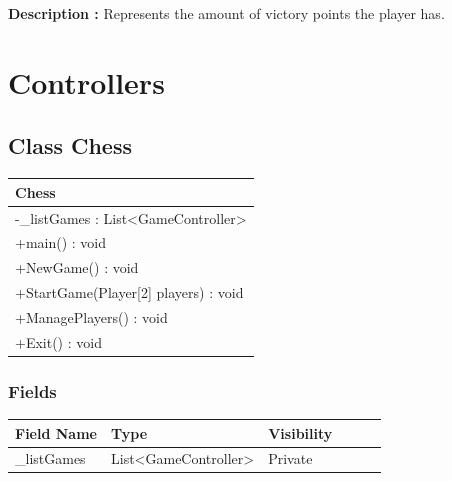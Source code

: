 \documentclass[12pt]{article}
\begin{document}
\textbf{Description :} Represents the amount of victory points the player has.  

\newpage


\section{Controllers}


\subsection{Class Chess}

\begin{table}[H]
    \begin{tabular}{|l|}
    \hline
    \rowcolor[HTML]{C0C0C0} 
    \textbf{Chess}                                             \\ \hline
    \rowcolor[HTML]{EFEFEF} 
    -\_listGames : List\textless{}GameController\textgreater{} \\ \hline
    +main() : void                                             \\ \hline
    +NewGame() : void                                          \\ \hline
    +StartGame(Player{[}2{]} players) : void                   \\ \hline
    +ManagePlayers() : void                                    \\ \hline
    +Exit() : void                                             \\ \hline
    \end{tabular}
\end{table}

\subsubsection{Fields}

\begin{table}[H]
    \begin{tabular}{llllll}
    \hline
    \multicolumn{1}{|l|}{\cellcolor[HTML]{EFEFEF}\textbf{Field Name}} & \multicolumn{1}{l|}{\cellcolor[HTML]{EFEFEF}\textbf{Type}} & \multicolumn{1}{l|}{\cellcolor[HTML]{EFEFEF}\textbf{Visibility}} \\ \hline
    \multicolumn{1}{|l|}{\_listGames}                                 & \multicolumn{1}{l|}{List<GameController>}                                & \multicolumn{1}{l|}{Private}                                     \\ \hline
    \end{tabular}
\end{table}
\end{document}

